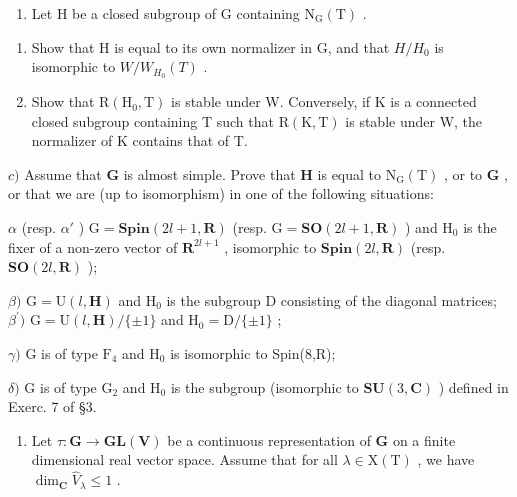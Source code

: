 \begin{enumerate}
\def\labelenumi{\arabic{enumi})}
\setcounter{enumi}{5}
\tightlist
\item
  Let \(\mathrm{H}\) be a closed subgroup of \(\mathrm{G}\) containing \(\mathrm{N}_{\mathrm{G}}(\mathrm{T})\) .
\end{enumerate}

\begin{enumerate}
\def\labelenumi{\alph{enumi})}
\item
  Show that H is equal to its own normalizer in G, and that \(H/H_{0}\) is isomorphic to \(W/W_{H_{0}}(T)\) .
\item
  Show that \(\mathrm{R}(\mathrm{H}_{0},\mathrm{T})\) is stable under W. Conversely, if K is a connected closed subgroup containing T such that \(\mathrm{R}(\mathrm{K},\mathrm{T})\) is stable under W, the normalizer of K contains that of T.
\end{enumerate}

\(c)\) Assume that \(\mathbf{G}\) is almost simple. Prove that \(\mathbf{H}\) is equal to \(\mathrm{N_G(T)}\) , or to \(\mathbf{G}\) , or that we are (up to isomorphism) in one of the following situations:

\(\alpha\) (resp. \(\alpha'\) ) \(\mathrm{G} = \mathbf{Spin}(2l + 1, \mathbf{R})\) (resp. \(\mathrm{G} = \mathbf{SO}(2l + 1, \mathbf{R})\) ) and \(\mathrm{H}_0\) is the fixer of a non-zero vector of \(\mathbf{R}^{2l + 1}\) , isomorphic to \(\mathbf{Spin}(2l, \mathbf{R})\) (resp. \(\mathbf{SO}(2l, \mathbf{R})\) );

\(\beta)\) \(\mathrm{G} = \mathrm{U}(l,\mathbf{H})\) and \(\mathrm{H}_0\) is the subgroup D consisting of the diagonal matrices; \(\beta^{\prime})\) \(\mathrm{G} = \mathrm{U}(l,\mathbf{H}) / \{\pm 1\}\) and \(\mathrm{H}_0 = \mathrm{D} / \{\pm 1\}\) ;

\(\gamma)\) G is of type \(\mathrm{F}_4\) and \(\mathrm{H}_0\) is isomorphic to Spin(8,R);

\(\delta)\) G is of type \(\mathrm{G}_2\) and \(\mathrm{H}_0\) is the subgroup (isomorphic to \(\mathbf{SU}(3,\mathbf{C})\) ) defined in Exerc. 7 of §3.

\begin{enumerate}
\def\labelenumi{\arabic{enumi})}
\setcounter{enumi}{6}
\tightlist
\item
  Let \(\tau : \mathbf{G} \to \mathbf{GL}(\mathbf{V})\) be a continuous representation of \(\mathbf{G}\) on a finite dimensional real vector space. Assume that for all \(\lambda \in \mathrm{X}(\mathrm{T})\) , we have \(\dim_{\mathbf{C}} \hat{V}_{\lambda} \leq 1\) .
\end{enumerate}

